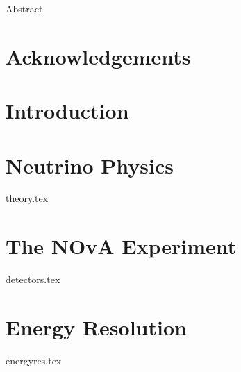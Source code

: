 \documentclass[a4paper,11pt]{report}
\newcommand{\linespacing}{1.5}
\renewcommand{\baselinestretch}{\linespacing}
\begin{document}
Abstract

%
%
%
\chapter*{Acknowledgements}
\renewcommand{\baselinestretch}{\linespacing}
\small\normalsize

%
%
%
\newpage
{}
\tableofcontents
\listoftables
{}
\listoffigures
{}
%
%
\newpage
{}

\chapter{Introduction}

\chapter{Neutrino Physics}
{theory.tex}

\chapter{The NOvA Experiment}
{detectors.tex}

\chapter{Energy Resolution}
{energyres.tex}


\clearpage
{}

 

\end{document}
